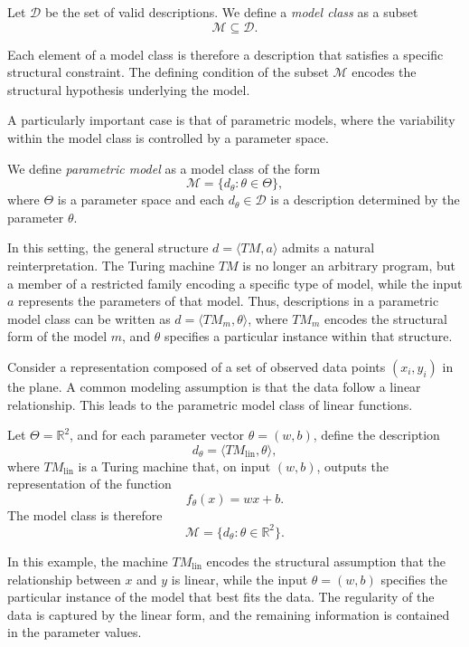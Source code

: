 \begin{definition}
\label{def:model_class}
Let \(\mathcal{D}\) be the set of valid descriptions. We define a \emph{model class} as a subset
\[
\mathcal{M} \subseteq \mathcal{D}.
\]
\end{definition}

Each element of a model class is therefore a description that satisfies a specific structural constraint. The defining condition of the subset $\mathcal{M}$ encodes the structural hypothesis underlying the model.

A particularly important case is that of parametric models, where the variability within the model class is controlled by a parameter space.

\begin{definition}
\label{def:parametric_model}
We define \emph{parametric model} as a model class of the form
\[
\mathcal{M} = \{ d_{\theta} : \theta \in \Theta \},
\]
where $\Theta$ is a parameter space and each $d_{\theta} \in \mathcal{D}$ is a description determined by the parameter $\theta$.
\end{definition}

In this setting, the general structure $d = \langle TM, a \rangle$ admits a natural reinterpretation. The Turing machine $TM$ is no longer an arbitrary program, but a member of a restricted family encoding a specific type of model, while the input $a$ represents the parameters of that model. Thus, descriptions in a parametric model class can be written as $d = \langle TM_m, \theta \rangle$, where $TM_m$ encodes the structural form of the model \(m\), and \(\theta\) specifies a particular instance within that structure.

\begin{example}
\label{ex:linear_regression_model}
Consider a representation composed of a set of observed data points $(x_i, y_i)$ in the plane. A common modeling assumption is that the data follow a linear relationship. This leads to the parametric model class of linear functions.

Let $\Theta = \mathbb{R}^2$, and for each parameter vector $\theta = (w,b)$, define the description
\[
d_{\theta} = \langle TM_{\text{lin}}, \theta \rangle,
\]
where $TM_{\text{lin}}$ is a Turing machine that, on input $(w,b)$, outputs the representation of the function
\[
f_{\theta}(x) = w x + b.
\]
The model class is therefore
\[
\mathcal{M} = \{ d_{\theta} : \theta \in \mathbb{R}^2 \}.
\]

In this example, the machine $TM_{\text{lin}}$ encodes the structural assumption that the relationship between $x$ and $y$ is linear, while the input $\theta = (w,b)$ specifies the particular instance of the model that best fits the data. The regularity of the data is captured by the linear form, and the remaining information is contained in the parameter values.
\end{example}

